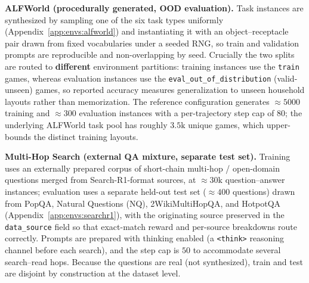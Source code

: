 \begin{table}[tbp]
\centering
\caption{OPD dataset scale and split construction. ``Train/Eval'' counts are task
instances (online rollouts, not stored trajectories); the per-trajectory step cap is the
data-side \texttt{max\_iterations} before any adaptive-depth truncation.}
\label{tab:data}
\small
\setlength{\tabcolsep}{8pt}
\end{table}

\textbf{ALFWorld (procedurally generated, OOD evaluation).} Task instances are
synthesized by sampling one of the six task types uniformly
(Appendix~\ref{app:envs:alfworld}) and instantiating it with an object--receptacle pair
drawn from fixed vocabularies under a seeded RNG, so train and validation prompts are
reproducible and non-overlapping by seed. Crucially the two splits are routed to
\textbf{different} environment partitions: training instances use the \texttt{train}
games, whereas evaluation instances use the \texttt{eval\_out\_of\_distribution}
(valid-unseen) games, so reported accuracy measures generalization to unseen household
layouts rather than memorization. The reference configuration generates $\approx5000$
training and $\approx300$ evaluation instances with a per-trajectory step cap of $80$;
the underlying ALFWorld task pool has roughly $3.5\mathrm{k}$ unique games, which upper-bounds
the distinct training layouts.

\textbf{Multi-Hop Search (external QA mixture, separate test set).} Training uses an
externally prepared corpus of short-chain multi-hop / open-domain questions merged from
Search-R1-format sources, at $\approx30\mathrm{k}$ question--answer instances;
evaluation uses a separate held-out test set ($\approx400$ questions) drawn from
PopQA, Natural Questions (NQ), 2WikiMultiHopQA, and HotpotQA
(Appendix~\ref{app:envs:searchr1}), with the originating source preserved in the
\texttt{data\_source} field so that exact-match reward and per-source breakdowns route
correctly. Prompts are prepared with thinking enabled (a \texttt{<think>} reasoning
channel before each search), and the step cap is $50$ to accommodate several
search--read hops. Because the questions are real (not synthesized), train and test are
disjoint by construction at the dataset level.

